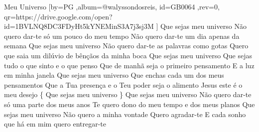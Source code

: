\beginsong
{Meu Universo %
}[by={PG %
},album={@walyssondosreis},
id={GB0064 %
},rev={0}, %
qr={https://drive.google.com/open?id=1BVLNQ8DC3FDyHt5kYNEMinS3A7j3sj3M %
}]
\beginverse*
Que sejas meu universo
Não quero dar-te só um pouco do meu tempo
Não quero dar-te um dia apenas da semana
\endverse
\beginverse*
Que sejas meu universo
Não quero dar-te as palavras como gotas
Quero que saia um dilúvio de bênçãos da minha boca
\endverse
\beginchorus
Que sejas meu universo
Que sejas tudo o que sinto e o que penso
Que de manhã seja o primeiro pensamento
E a luz em minha janela
Que sejas meu universo
Que enchas cada um dos meus pensamentos
Que a Tua presença e o Teu poder seja o alimento
Jesus este é o meu desejo
\{ Que sejas meu universo \}
\endchorus
\beginverse*
Que sejas meu universo
Não quero dar-te só uma parte dos meus anos
Te quero dono do meu tempo e dos meus planos
\endverse
\beginverse*
Que sejas meu universo
Não quero a minha vontade
Quero agradar-te
E cada sonho que há em mim quero entregar-te
\endverse
\vspace{4em} %
\begin{comment}
\lstset{basicstyle=\scriptsize\bf} %
\tab{Solo 1}
\begin{lstlisting}
E|-----------------------------------------------------|
B|-----------------------------------------------------|
G|-----------------------------------------------------|
D|-----------------------------------------------------|
A|-----------------------------------------------------|
E|-----------------------------------------------------|
\end{lstlisting}
\end{comment}
 

